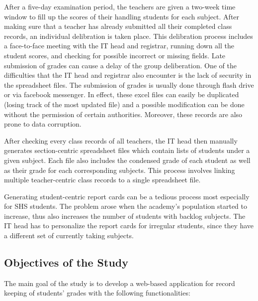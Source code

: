 \documentclass[11pt,a4paper,titlepage]{article}
\begin{document}
After a five-day examination period, the teachers are given a two-week time window to fill up the scores of their handling students for each subject. After making sure that a teacher has already submitted all their completed class records, an individual delibration is taken place. This delibration process includes a face-to-face meeting with the IT head and registrar, running down all the student scores, and checking for possible incorrect or missing fields. Late submission of grades can cause a delay of the group deliberation.   
One of the difficulties that the IT head and registrar also encounter is the lack of security in the spreadsheet files. The submission of grades is usually done through flash drive or via facebook messenger. In effect, these excel files can easily be duplicated (losing track of the most updated file) and a possible modification can be done without the permission of certain authorities. Moreover, these records are also prone to data corruption.

 After checking every class records of all teachers, the IT head then manually generates section-centric spreadsheet files which contain  lists of students under a given subject. Each file also includes the condensed grade of each student as well as their grade for each corresponding subjects. This process involves linking multiple teacher-centric class records to a single spreadsheet file. 

Generating student-centric report cards can be a tedious process most especially for SHS students. The problem arose when the academy's population started to increase, thus also increases the number of students with backlog subjects. The IT head has to personalize the report cards for irregular students, since they have a different set of currently taking subjects.  






\subsection{Objectives of the Study}
The main goal of the study is to develop a web-based application for record keeping of students' grades with the following functionalities:
\end{document}
